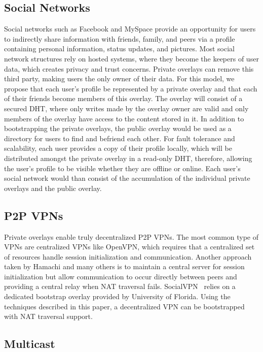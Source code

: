 \documentclass[conference]{IEEEtran}
\begin{document}
\subsection{Social Networks}

Social networks such as Facebook and MySpace provide an opportunity for users
to indirectly share information with friends, family, and peers via a profile
containing personal information, status updates, and pictures.  Most social
network structures rely on hosted systems, where they become the keepers of
user data, which creates privacy and trust concerns.  Private overlays can
remove this third party, making users the only owner of their data.  For this
model, we propose that each user's profile be represented by a private overlay
and that each of their friends become members of this overlay.  The overlay
will consist of a secured DHT, where only writes made by the overlay owner are
valid and only members of the overlay have access to the content stored in it.
In addition to bootstrapping the private overlays, the public overlay would be
used as a directory for users to find and befriend each other.  For fault
tolerance and scalability, each user provides a copy of their profile locally,
which will be distributed amongst the private overlay in a read-only DHT,
therefore, allowing the user's profile to be visible whether they are offline
or online.  Each user's social network would than consist of the accumulation
of the individual private overlays and the public overlay.

\subsection{P2P VPNs}

Private overlays enable truly decentralized P2P VPNs.  The most common type of
VPNs are centralized VPNs like OpenVPN, which requires that a centralized set
of resources handle session initialization and communication.  Another approach
taken by Hamachi and many others is to maintain a central server for session
initialization but allow communication to occur directly between peers and
providing a central relay when NAT traversal fails.  SocialVPN~\cite{socialvpn}
relies on a dedicated bootstrap overlay provided by University of Florida.
Using the techniques described in this paper, a decentralized VPN can be
bootstrapped with NAT traversal support.

\subsection{Multicast}
\end{document}
